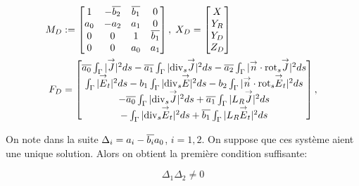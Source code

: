 			\begin{align*}
				M_D&:=
				\begin{bmatrix}
					1&-{\overline{b_2}}&{\overline{b_1}}&0\\
					a_0&-a_2&a_1&0\\
					0&0&1&{\overline{b_1}}\\
					0&0&a_0&a_1\\
				\end{bmatrix},\;
				X_D =
				\begin{bmatrix}
					X\\
					Y_R\\
					Y_D\\
					Z_D
				\end{bmatrix}\\
				F_D &=
				\begin{bmatrix}
					{\overline{a_0}} \int_\Gamma |{\overset{\rightarrow}{J}}|^2ds - {\overline{a_1}} \int_\Gamma |{\operatorname{div}_s} {\overset{\rightarrow}{J}}|^2 ds - {\overline{a_2}} \int_\Gamma |{\overset{\rightarrow}{n}} \cdot {{\operatorname{rot}}_s} {\overset{\rightarrow}{J}}|^2 ds \\
					\int_\Gamma |{\overset{\rightarrow}{E}}_t|^2 ds  - b_1 \int_\Gamma | {\operatorname{div}_s} {\overset{\rightarrow}{E}} |^2 ds - b_2 \int_\Gamma | {\overset{\rightarrow}{n}} \cdot {{\operatorname{rot}}_s} {\overset{\rightarrow}{E}}_t|^2 ds \\
					-{\overline{a_0}} \int_\Gamma |{\operatorname{div}_s} {\overset{\rightarrow}{J}}|^2ds + {\overline{a_1}} \int_\Gamma | L_R {\overset{\rightarrow}{J}}|^2 ds \\
					-\int_\Gamma | {\operatorname{div}_s} {\overset{\rightarrow}{E}}_t |^2 ds  + {\overline{b_1}} \int_\Gamma | L_R {\overset{\rightarrow}{E}}_t|^2 ds
				\end{bmatrix},\;
			\end{align*}

			On note dans la suite $\Delta_i = a_i-{\overline{b_i}}a_0$, $i=1,2$. On suppose que ces système aient une unique solution. Alors on obtient la première condition suffisante:

			\begin{equation}
				\label{eq:unicite:ci3:csu3-cn-det}
				\Delta_1\Delta_2 \not = 0
			\end{equation}

